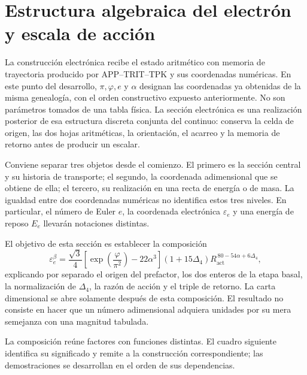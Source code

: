 \section{Estructura algebraica del electrón y escala de acción}
\label{x_reciprocidad:sec:electron}

La construcción electrónica recibe el estado aritmético con memoria de
trayectoria producido por APP--TRIT--TPK y sus coordenadas numéricas. En este punto del desarrollo,
\(\pi,\varphi,e\) y \(\alpha\) designan las coordenadas ya obtenidas de
la misma genealogía, con el orden constructivo expuesto anteriormente. No
son parámetros tomados de una tabla física. La sección electrónica es una
realización posterior de esa estructura discreta conjunta del continuo:
conserva la celda de origen, las dos hojas aritméticas, la orientación, el
acarreo y la memoria de retorno antes de producir un escalar.

Conviene separar tres objetos desde el comienzo. El primero es la sección
central y su historia de transporte; el segundo, la coordenada
adimensional que se obtiene de ella; el tercero, su realización en una
recta de energía o de masa. La igualdad entre dos coordenadas numéricas no
identifica estos tres niveles. En particular, el número de Euler \(e\),
la coordenada electrónica \(\varepsilon_e\) y una energía de reposo
\(E_e\) llevarán notaciones distintas.

El objetivo de esta sección es establecer la composición
\begin{equation}
 \varepsilon_e^{\beta}
 =\frac{\sqrt3}{4}
  \left[\exp\!\left(\frac{\varphi}{\pi^2}\right)-22\alpha^3\right]
  (1+15\Delta_4)
  R_{\mathrm{act}}^{\,80-54\alpha+6\Delta_4},
 \label{x_reciprocidad:eq:el-formula-completa}
\end{equation}
explicando por separado el origen del prefactor, los dos enteros de la
etapa basal, la normalización de \(\Delta_4\), la razón de acción y el
triple de retorno. La carta dimensional se abre solamente después de
esta composición. El resultado no consiste en hacer que un número
adimensional adquiera unidades por su mera semejanza con una magnitud
tabulada.

La composición reúne factores con funciones distintas. El cuadro
siguiente identifica su significado y remite a la construcción
correspondiente; las demostraciones se desarrollan en el orden de sus
dependencias.

